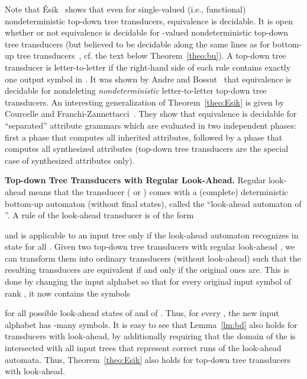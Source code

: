 \documentclass[copyright,creativecommons]{eptcs}
\begin{document}
Note that {\'E}sik~\cite{DBLP:journals/actaC/Esik81} shows that
even for single-valued (i.e., functional) nondeterministic top-down
tree transducers, equivalence is decidable. 
It is open whether or not equivalence is decidable for
-valued nondeterministic top-down tree transducers
(but believed to be decidable along the same lines as for bottom-up
tree transducers~\cite{sei2014}, cf. the text below Theorem~\ref{theo:bu}).
A top-down tree transducer is letter-to-letter if the right-hand
side of each rule contains exactly one output symbol in .
It was shown by Andre and Bossut~\cite{DBLP:journals/tcs/AndreB98}
that equivalence is decidable for nondeleting \emph{nondeterministic} letter-to-letter
top-down tree transducers.
An interesting generalization of Theorem~\ref{theo:Esik} is given
by Courcelle and Franchi-Zannettacci~\cite{DBLP:journals/iandc/CourcelleF82}.
They show that equivalence is decidable for ``separated'' attribute grammars which are 
evaluated in two
independent phases: first a phase that computes all inherited
attributes, followed by a phase that computes all synthesized attributes
(top-down tree transducers are the special case of synthesized
attributes only).

\bigskip

{\bf Top-down Tree Transducers with Regular Look-Ahead.}\quad
Regular look-ahead means that the transducer ( or ) comes with
a (complete) deterministic bottom-up automaton (without final
states), called the ``look-ahead
automaton of ''. A rule of the look-ahead transducer is of the form

and is applicable to an input tree  only if 
the look-ahead automaton recognizes  in state  for all .   
Given two top-down tree
transducers with regular look-ahead , we can transform them into
ordinary transducers (without look-ahead)  such that the resulting
transducers are equivalent if and only if the original ones are.
This is done by changing the input alphabet so that 
for every original input symbol  of rank , 
it now contains the symbols 

for all possible look-ahead states  of  and  of .
Thus, for every , the 
new input alphabet has -many symbols.
It is easy to see that Lemma~\ref{lm:bd} also holds 
for transducers with look-ahead, by additionally requiring
that the domain  of the  is intersected with all input trees that represent
correct runs of the look-ahead automata. 
Thus, Theorem~\ref{theo:Esik} also holds for top-down tree transducers with look-ahead. 
\end{document}
